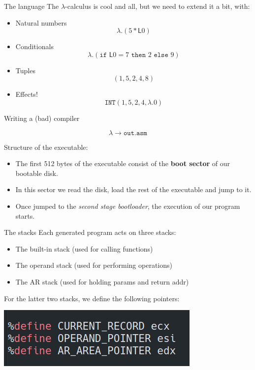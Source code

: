 \documentclass{beamer}
\renewcommand{\L}{\mathsf{L}}
\begin{document}
 \begin{frame}{The language}
 The $\lambda$-calculus is cool and all, but we need to extend it a bit, with:
 \begin{itemize}
  \item Natural numbers
  \[\lambda. (5 * \L0)\]
  \item Conditionals
  \[ \lambda.(\texttt{if } \L0 = 7 \texttt{ then } 2 \texttt{ else } 9)\]
  \item Tuples
  \[(1, 5, 2, 4, 8)\]
  \item Effects!
  \[\texttt{INT}(1, 5, 2, 4, \lambda. 0)\]
 \end{itemize}

 \end{frame}

 \begin{frame}{Writing a (bad) compiler}
\begin{framed}
{\huge \[\lambda \longrightarrow \texttt{out.asm}\]}
\end{framed}


  Structure of the executable:
  \begin{itemize}
   \item The first 512 bytes of the executable consist of the \textbf{boot sector} of our bootable disk.
   \item In this sector we read the disk, load the rest of the executable and jump to it.
   \item Once jumped to the \emph{second stage bootloader}, the execution of our program starts.
  \end{itemize}

 \end{frame}

 \begin{frame}{The stacks}
  Each generated program acts on three stacks:
  \begin{itemize}
   \item The built-in stack \hfill(used for calling functions)
   \item The operand stack \hfill(used for performing operations)
   \item The AR stack \hfill(used for holding params and return addr)
  \end{itemize}\medskip

  For the latter two stacks, we define the following pointers:

  \begin{center}
   \includegraphics[scale = .7]{pointers}
  \end{center}

 \end{frame}
\end{document}
